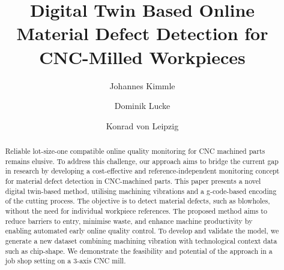 \documentclass[5p,times,procedia]{elsarticle}
\begin{document}
\begin{frontmatter}






\title{Digital Twin Based Online Material Defect Detection for CNC-Milled Workpieces}




\author[a,b]{Johannes Kimmle} 
\author[a,c]{Dominik Lucke}%
\author[b]{Konrad von Leipzig}

\address[a]{ESB Business School, Reutlingen University, Alteburgstra\ss e 150, 72762 Reutlingen, Germany}
\address[b]{Department of Industrial Engineering, Stellenbosch University, Joubert Street, Stellenbosch, 7600, South Africa}
\address[c]{Fraunhofer Institute for Manufacturing Engineering and Automation IPA, Nobelstra\ss e 12, 70569 Stuttgart, Germany}


\begin{abstract}
Reliable lot-size-one compatible online quality monitoring for CNC machined parts remains elusive.
To address this challenge, our approach aims to bridge the current gap in research by developing a cost-effective and reference-independent monitoring concept for material defect detection in CNC-machined parts. This paper presents a novel digital twin-based method, utilising machining vibrations and a g-code-based encoding of the cutting process. The objective is to detect material defects, such as blowholes, without the need for individual workpiece references. The proposed method aims to reduce barriers to entry, minimise waste, and enhance machine productivity by enabling automated early online quality control. To develop and validate the model, we generate a new dataset combining machining vibration with technological context data such as chip-shape. We demonstrate the feasibility and potential of the approach in a job shop setting on a 3-axis CNC mill.
\end{abstract}


\end{frontmatter}
\end{document}
